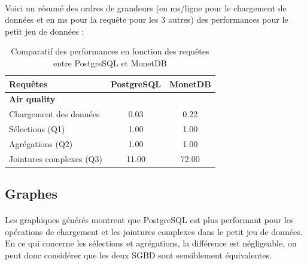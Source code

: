 \documentclass[11pt]{extarticle}
\begin{document}
\paragraph{}
Voici un résumé des ordres de grandeurs (en ms/ligne pour le chargement de données et en ms pour la requête pour les 3 autres) des performances pour le petit jeu de données :


\begin{table}[ht]
    \centering
    \setlength\arrayrulewidth{1pt}
    \def\arraystretch{0.82}
    \begin{tabular}{|l|c|c|}
    \hline
         \textbf{Requêtes} &  \textbf{PostgreSQL}
         & \textbf{MonetDB} \\ \hline
         \rowcolor[HTML]{343434} 
                    {\color[HTML]{FFFFFF} \textbf{Air quality}} &  & \\ \hline
                    Chargement des données & \cellcolor[HTML]{FCBF01}0.03 &0.22  \\ \hline
                    Sélections (Q1) &1.00 &1.00 \\ \hline
                    Agrégations (Q2) &1.00 &1.00 \\ \hline
                    Jointures complexes (Q3) & \cellcolor[HTML]{FCBF01}11.00 & 72.00 \\ \hline
                    
                    
    \end{tabular}
    \caption{Comparatif des performances en fonction des requêtes entre PostgreSQL et MonetDB}
    \label{tab:my_label2}
\end{table}

\subsection{Graphes}
\paragraph{}
Les graphiques générés montrent que PostgreSQL est plus performant pour les opérations de chargement et les jointures complexes dans le petit jeu de données. En ce qui concerne les sélections et agrégations, la différence est négligeable, on peut donc considérer que les deux SGBD sont sensiblement équivalentes.
\end{document}
